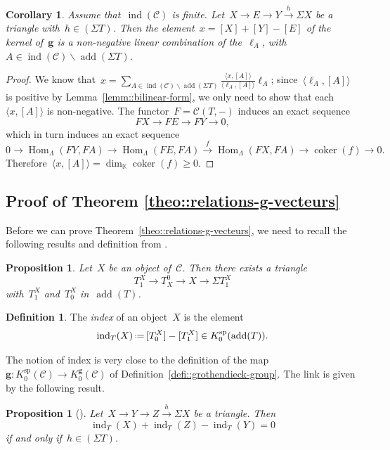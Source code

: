 \documentclass{amsart}
\newtheorem{corollary}[theorem]{Corollary}
\newtheorem{proposition}[theorem]{Proposition}
\theoremstyle{definition}
\newtheorem{definition}[theorem]{Definition}
\renewcommand{\b}[1]{{\boldsymbol{#1}}} %
\newcommand{\ssm}{\smallsetminus} %
\newcommand{\eqdef}{\mbox{\,\raisebox{0.2ex}{\scriptsize\ensuremath{\mathrm:}}\ensuremath{=}\,}} %
\newcommand{\darkblue}{\color{darkblue}} %
\newcommand{\defn}[1]{\textsl{\darkblue #1}} %
\newcommand{\field}{\mathbb{K}}
\newcommand{\cat}{\mathcal{C}}
\newcommand{\Hom}[1]{\operatorname{Hom}_{#1}}
\newcommand{\susp}{\Sigma}
\newcommand{\add}{\operatorname{add}}
\newcommand{\spl}{\operatorname{sp}}
\newcommand{\Ksp}{K_0^{\spl}}
\newcommand{\Kg}{K_0^{\b{g}}}
\newcommand{\ind}{\operatorname{ind}}
\newcommand{\coker}{\operatorname{coker}}
\begin{document}
\begin{corollary}\label{corollary::meshes positively generate cluster cats}
 Assume that~$\ind(\cat)$ is finite.  Let~$X\xrightarrow{} E \xrightarrow{} Y \xrightarrow{h} \susp X$ be a triangle with~$h\in (\susp T)$.  Then the element~$x=[X]+[Y]-[E]$ of the kernel of~$\b g$ is a non-negative linear combination of the~$\ell_A$, with~$A\in \ind(\cat)\ssm \add(\susp T)$.
\end{corollary}
\begin{proof}
 We know that~$x=\sum_{A\in \ind(\cat) \ssm \add(\susp T)} \frac{\langle x, [A] \rangle}{\langle \ell_A, [A] \rangle} \ell_A$; since~$\langle \ell_A, [A] \rangle$ is positive by Lemma~\ref{lemm::bilinear-form}, we only need to show that each~$\langle x, [A] \rangle$ is non-negative. 
 The functor~$F=\cat(T,-)$ induces an exact sequence
 \[
  FX \to FE \to FY \to 0,
 \]
 which in turn induces an exact sequence
 \[
  0\to \Hom{\Lambda}(FY, FA) \to \Hom{\Lambda}(FE, FA) \xrightarrow{f} \Hom{\Lambda}(FX, FA) \to \coker(f) \to 0.
 \]
 Therefore~$\langle x, [A] \rangle = \dim_{\field} \coker(f) \geq 0$.
\end{proof}


\subsection{Proof of Theorem \ref{theo::relations-g-vecteurs}}

Before we can prove Theorem~\ref{theo::relations-g-vecteurs}, we need to recall the following results and definition from \cite{DehyKeller,Palu}.

\begin{proposition}
 Let~$X$ be an object of~$\cat$. Then there exists a triangle
 \[
  T_1^X \to T^0_X \to X \to \susp T_1^X
 \]
 with~$T_1^X$ and~$T_0^X$ in~$\add(T)$.

\end{proposition}

\begin{definition}
 The \defn{index} of an object~$X$ is the element
 \[
  \ind_T(X) \eqdef [T_0^X] - [T_1^X] \in \Ksp(\add(T)).
 \]
\end{definition}

The notion of index is very close to the definition of the map~$\b g:\Ksp(\cat)\to \Kg(\cat)$ of Definition~\ref{defi::grothendieck-group}.  The link is given by the following result.

\begin{proposition}[\cite{Palu}]
 Let~$X\xrightarrow{} Y \xrightarrow{} Z \xrightarrow{h} \susp X$ be a triangle.
 Then
 \[
  \ind_T(X) + \ind_T(Z) - \ind_T(Y) = 0
 \]
 if and only if~$h\in (\susp T)$.
\end{proposition}
\end{document}
